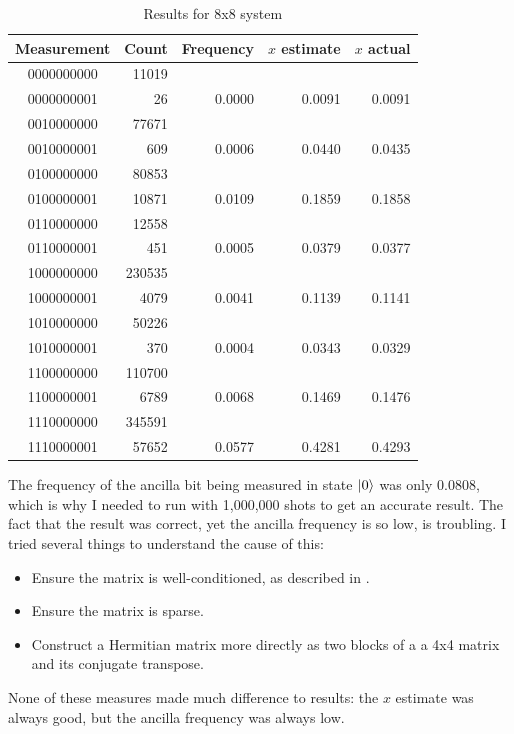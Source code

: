 \documentclass[12pt]{extarticle}
\begin{document}
\begin{table}[h]
\begin{center}
\begin{tabular}{|c|r|r|r|r|}
\hline
Measurement & Count & Frequency & $x$ estimate & $x$ actual \\
\hline
0000000000  &  11019 & & & \\
0000000001  &     26 & 0.0000 & 0.0091 & 0.0091 \\
0010000000  &  77671 & & & \\
0010000001  &    609 & 0.0006 & 0.0440 & 0.0435 \\
0100000000  &  80853 & & & \\
0100000001  &  10871 & 0.0109 & 0.1859 & 0.1858 \\
0110000000  &  12558 & & & \\
0110000001  &    451 & 0.0005 & 0.0379 & 0.0377 \\
1000000000  & 230535 & & & \\
1000000001  &   4079 & 0.0041 & 0.1139 & 0.1141 \\
1010000000  &  50226 & & & \\
1010000001  &    370 & 0.0004 & 0.0343 & 0.0329 \\
1100000000  & 110700 & & & \\
1100000001  &   6789 & 0.0068 & 0.1469 & 0.1476 \\
1110000000  & 345591 & & & \\
1110000001  &  57652 & 0.0577 & 0.4281 & 0.4293 \\
\hline
\end{tabular}
\caption{Results for 8x8 system}
\label{tab:results8x8}
\end{center}
\end{table}

The frequency of the ancilla bit being measured in state $\ket{0}$ was only 0.0808, which is why I needed to run with 1,000,000 shots to get an accurate result.
The fact that the result was correct, yet the ancilla frequency is so low, is troubling.
I tried several things to understand the cause of this:
\begin{itemize}
\item Ensure the matrix is well-conditioned, as described in \cite{hhl2009}.
\item Ensure the matrix is sparse.
\item Construct a Hermitian matrix more directly as two blocks of a a 4x4 matrix and its conjugate transpose.
\end{itemize}
None of these measures made much difference to results: the $x$ estimate was always good, but the ancilla frequency was always low.
\end{document}
